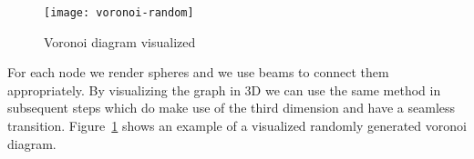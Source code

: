 \begin{figure}[h]
	\centering
	\texttt{[image: voronoi-random]}
	\caption{Voronoi diagram visualized}
	\label{fig:voronoi-random}
\end{figure}

For each node we render spheres and we use beams to connect them appropriately. By visualizing the graph in 3D we can use the same method in subsequent steps which do make use of the third dimension and have a seamless transition. Figure~\ref{fig:voronoi-random} shows an example of a visualized randomly generated voronoi diagram.